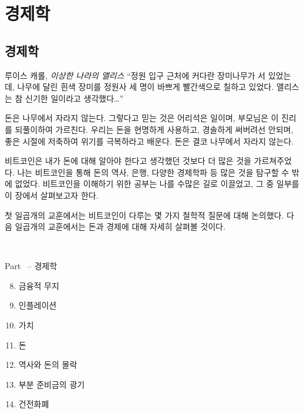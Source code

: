 \part{경제학}
\label{ch:economics}
\chapter*{경제학}

\begin{chapquote}{루이스 캐롤, \textit{이상한 나라의 앨리스}}
	\enquote{정원 입구 근처에 커다란 장미나무가 서 있었는데, 나무에 달린 흰색 장미를 정원사 세 명이 바쁘게 빨간색으로 칠하고 있었다.
		앨리스는 참 신기한 일이라고 생각했다\ldots}
\end{chapquote}

돈은 나무에서 자라지 않는다. 그렇다고 믿는 것은 어리석은 일이며, 부모님은 이 진리를 되풀이하여 가르친다.
우리는 돈을 현명하게 사용하고, 경솔하게 써버려선 안되며, 좋은 시절에 저축하여 위기를 극복하라고 배운다. 
돈은 결코 나무에서 자라지 않는다.

비트코인은 내가 돈에 대해 알아야 한다고 생각했던 것보다 더 많은 것을 가르쳐주었다. 
나는 비트코인을 통해 돈의 역사, 은행, 다양한 경제학파 등 많은 것을 탐구할 수 밖에 없었다.
비트코인을 이해하기 위한 공부는 나를 수많은 길로 이끌었고, 그 중 일부를 이 장에서 살펴보고자 한다. 

첫 일곱개의 교훈에서는 비트코인이 다루는 몇 가지 철학적 질문에 대해 논의했다.
다음 일곱개의 교훈에서는 돈과 경제에 대해 자세히 살펴볼 것이다. 

~

\begin{samepage}
	Part~\ref{ch:economics} -- 경제학
	
	\begin{enumerate}
		\setcounter{enumi}{7}
		\item 금융적 무지
		\item 인플레이션
		\item 가치
		\item 돈
		\item 역사와 돈의 몰락
		\item 부분 준비금의 광기
		\item 건전화폐
\end{enumerate}
\end{samepage}

